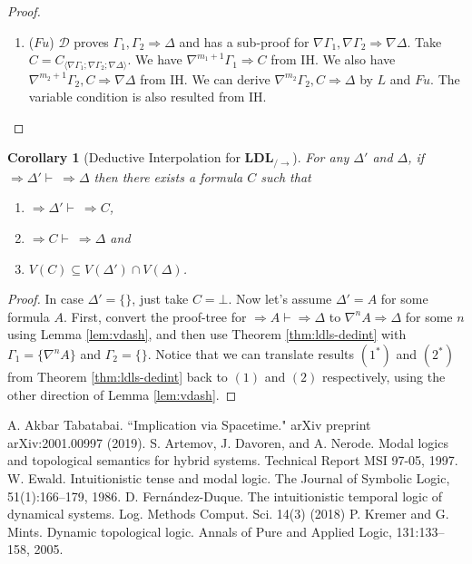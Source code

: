 \documentclass[12pt,a4paper]{article}
\theoremstyle{plain}
\newtheorem{cor}[thm]{Corollary}
\theoremstyle{definition}
\begin{document}
\begin{proof}
\begin{enumerate}
		\item ($Fu$) $\mathcal{D}$ proves $\Gamma_1, \Gamma_2 \Rightarrow \Delta$ and has a sub-proof for $\nabla \Gamma_1, \nabla \Gamma_2 \Rightarrow \nabla \Delta$. Take $C = C_{\langle\nabla\Gamma_1;\nabla\Gamma_2;\nabla\Delta\rangle}$. We have $\nabla^{m_1+1}\Gamma_1 \Rightarrow C$ from IH. We also have $\nabla^{m_2+1} \Gamma_2, C \Rightarrow \nabla \Delta$ from IH. We can derive $\nabla^{m_2} \Gamma_2, C \Rightarrow \Delta$ by $L$ and $Fu$. The variable condition is also resulted from IH.
	\end{enumerate}
\end{proof}

\begin{cor}[Deductive Interpolation for $\mathbf{LDL}_{/\rightarrow}$] For any $\Delta'$ and $\Delta$, if $\Rightarrow \Delta' \vdash\ \Rightarrow \Delta$ then there exists a formula $C$ such that
	\begin{enumerate}[label=(\arabic*)]
		\item $\Rightarrow \Delta' \vdash\ \Rightarrow C$,
		\item $\Rightarrow C \vdash\ \Rightarrow \Delta$ and
		\item $V(C) \subseteq V(\Delta') \cap V(\Delta)$.
	\end{enumerate}
\end{cor}
\begin{proof}
	In case $\Delta' = \{\}$, just take $C = \bot$. Now let's assume $\Delta' = A$ for some formula $A$. First, convert the proof-tree for $\Rightarrow A \vdash \Rightarrow \Delta$ to $\nabla^n A \Rightarrow \Delta$ for some $n$ using Lemma \ref{lem:vdash}, and then use Theorem \ref{thm:ldls-dedint} with $\Gamma_1 = \{\nabla^n A \}$ and $\Gamma_2 = \{\}$. Notice that we can translate results $(\mathit{1}^*)$ and $(\mathit{2}^*)$ from Theorem \ref{thm:ldls-dedint} back to $(\mathit{1})$ and $(\mathit{2})$ respectively, using the other direction of Lemma \ref{lem:vdash}.
\end{proof}
\begin{thebibliography}{99}

A. Akbar Tabatabai. ``Implication via Spacetime." arXiv preprint arXiv:2001.00997 (2019).
S. Artemov, J. Davoren, and A. Nerode. Modal logics and topological semantics for hybrid systems. Technical Report MSI 97-05, 1997.
W. Ewald. Intuitionistic tense and modal logic. The Journal of Symbolic Logic, 51(1):166–179, 1986.
D. Fernández-Duque. The intuitionistic temporal logic of dynamical systems. Log. Methods Comput. Sci. 14(3) (2018)
P. Kremer and G. Mints. Dynamic topological logic. Annals of Pure and Applied Logic, 131:133–158, 2005.

\end{thebibliography}
\end{document}
